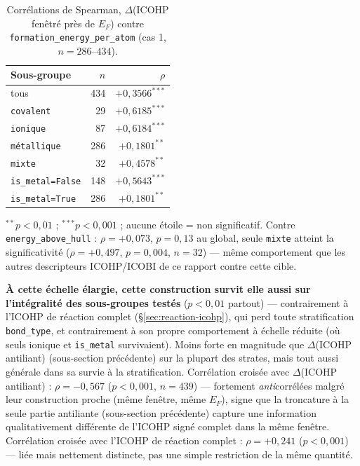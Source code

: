\documentclass[11pt,a4paper]{article}
\begin{document}
\begin{table}[htbp]
\centering
\caption{Corrélations de Spearman, $\Delta$(ICOHP fenêtré près de $E_F$) contre \texttt{formation\_energy\_per\_atom} (cas 1, $n=286$--$434$).}
\label{tab:reaction-icohp-windowed}
\begin{tabular}{@{}lrr@{}}
\toprule
Sous-groupe & $n$ & $\rho$ \\
\midrule
tous                & 434 & $+0{,}3566^{***}$ \\
\texttt{covalent}   & 29  & $+0{,}6185^{***}$ \\
\texttt{ionique}    & 87  & $+0{,}6184^{***}$ \\
\texttt{métallique} & 286 & $+0{,}1801^{**}$ \\
\texttt{mixte}      & 32  & $+0{,}4578^{**}$ \\
\texttt{is\_metal=False} & 148 & $+0{,}5643^{***}$ \\
\texttt{is\_metal=True}  & 286 & $+0{,}1801^{**}$ \\
\bottomrule
\end{tabular}

\vspace{0.15cm}
{\footnotesize $^{**}p<0{,}01$ ; $^{***}p<0{,}001$ ; aucune étoile = non
significatif. Contre \texttt{energy\_above\_hull} : $\rho=+0{,}073$,
$p=0{,}13$ au global, seule \texttt{mixte} atteint la significativité
($\rho=+0{,}497$, $p=0{,}004$, $n=32$) --- même comportement que les
autres descripteurs ICOHP/ICOBI de ce rapport contre cette cible.}
\end{table}

\textbf{À cette échelle élargie, cette construction survit elle aussi
sur l'intégralité des sous-groupes testés} ($p<0{,}01$ partout) ---
contrairement à l'ICOHP de réaction complet (\S\ref{sec:reaction-icohp}),
qui perd toute stratification \texttt{bond\_type}, et contrairement à
son propre comportement à échelle réduite (où seuls ionique et
\texttt{is\_metal} survivaient). Moins forte en magnitude que
$\Delta$(ICOHP antiliant) (sous-section précédente) sur la plupart des
strates, mais tout aussi générale dans sa survie à la
stratification. Corrélation croisée avec $\Delta$(ICOHP antiliant) :
$\rho=-0{,}567$ ($p<0{,}001$, $n=439$) --- fortement \emph{anti}corrélées
malgré leur construction proche (même fenêtre, même $E_F$), signe que
la troncature à la seule partie antiliante (sous-section précédente)
capture une information qualitativement différente de l'ICOHP signé
complet dans la même fenêtre. Corrélation croisée avec l'ICOHP de
réaction complet : $\rho=+0{,}241$ ($p<0{,}001$) --- liée mais nettement
distincte, pas une simple restriction de la même quantité.
\end{document}
